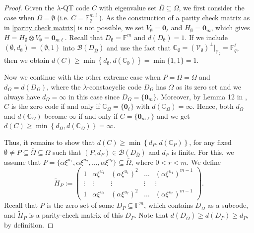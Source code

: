\documentclass[11pt]{amsart}
\theoremstyle{plain}
\theoremstyle{definition}
\numberwithin{equation}{section}
\newcommand{\Fq}{\mathbb{F}_{q}}
\newcommand{\F}{{\mathbb F}}
\begin{document}
\begin{proof}
Given the $\lambda$-QT code $C$ with eigenvalue set $\overline{\Omega}\subseteq\Omega$, we first consider the case when $\overline{\Omega}=\emptyset$ (i.e. $C=\Fq^{m\ell}$). As the construction of a parity check matrix as in \eqref{parity check matrix} is not possible, we set $V_{\emptyset}=\mathbf{0}_\ell$ and $H_{\emptyset}=\mathbf{0}_m$, which gives $H=H_{\emptyset}\otimes V_{\emptyset}=\mathbf{0}_{m\ell}$. Recall that $D_{\emptyset}=\F^m$ and $d(D_{\emptyset})=1$. If we include $(\emptyset,d_{\emptyset})=(\emptyset,1)$ into $\mathcal{B}(D_{\overline{\Omega}})$ and use the fact that $\mathbb{C}_{\emptyset}=(\mathcal{V}_{\emptyset})^{\perp} \bigr\rvert_{\Fq}=\Fq^\ell$, then we obtain $d(C)\geq \min \left\{ d_{\emptyset}, d(\mathbb{C}_{\emptyset}) \right\}=\min\{1,1\}=1$.

Now we continue with the other extreme case when $P=\overline{\Omega}=\Omega$ and $d_{\Omega}=d(D_{\Omega})$, where the $\lambda$-constacyclic code $D_{\Omega}$ has $\Omega$ as its zero set and we always have $d_{\Omega}=\infty$ in this case since $D_{\Omega}=\{\mathbf{0}_{m}\}$. Moreover, by Lemma 12 in \cite{ELLOT}, $C$ is the zero code if and only if $\mathbb{C}_{\Omega}=\{\mathbf{0}_{\ell}\}$ with $d(\mathbb{C}_{\Omega})=\infty$. Hence, both $d_{\Omega}$ and $d(\mathbb{C}_{\Omega})$ become $\infty$ if and only if $C=\{\mathbf{0}_{m\ell}\}$ and we get $d(C) \geq \min \left\{ d_{\Omega}, d(\mathbb{C}_{\Omega}) \right\}=\infty$.

Thus, it remains to show that $d(C) \geq \min \left\{d_P, d(\mathbb{C}_P) \right\}$, for any fixed $\emptyset \neq P\subseteq \overline{\Omega} \subseteq \Omega$ such that $(P, d_P)\in \mathcal{B}(D_{\overline{\Omega}})$ and $d_P$ is finite. For this, we assume that $P =\{\alpha\xi^{u_1}, \alpha\xi^{u_2},\ldots,\alpha\xi^{u_r}\}\subseteq \overline{\Omega}$, where $0<r< m$.  We define 
\begin{equation}\label{pmatrix}
\widetilde{H}_P:=\begin{pmatrix}
1&\alpha\xi^{u_1}&(\alpha\xi^{u_1})^2&\ldots&(\alpha\xi^{u_1})^{m-1}\\
\vdots & \vdots & \vdots & \vdots & \vdots \\
1&\alpha\xi^{u_r}&(\alpha\xi^{u_r})^2&\ldots&(\alpha\xi^{u_r})^{m-1}
\end{pmatrix}.
\end{equation}
Recall that $P$ is the zero set of some $D_P\subseteq\F^m$, which contains $D_{\overline{\Omega}}$ as a subcode, and $\widetilde{H}_P$ is a parity-check matrix of this $D_P$. Note that $d(D_{\overline{\Omega}})\geq d(D_P) \geq d_P$, by definition.


\end{proof}
\end{document}
